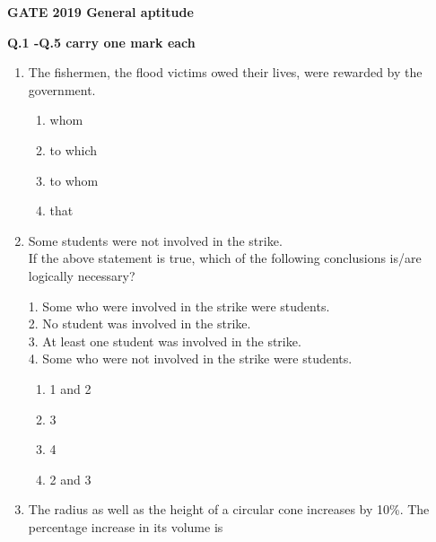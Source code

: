 \documentclass[journal,12pt,onecolumn]{IEEEtran}
\begin{document}
\begin{center}
\large\textbf{GATE 2019 General aptitude}
\end{center}

\vspace{2em}

\textbf{Q.1 -Q.5 carry one mark each}

\begin{enumerate}[itemsep=0.5cm]
    
\item The fishermen, \underline{\hspace{2cm}}  the flood victims owed their lives, were rewarded by the government.

\hfill{}
\begin{multicols}{4}
\begin{enumerate}
    \item whom
    \item to which
    \item to whom
    \item that
\end{enumerate}
\end{multicols}

\item Some students were not involved in the strike.\\
If the above statement is true, which of the following conclusions is/are logically necessary?

\vspace{1em}

    1. Some who were involved in the strike were students.\\
    2. No student was involved in the strike.\\
    3. At least one student was involved in the strike.\\
    4. Some who were not involved in the strike were students.

\hfill{}    

\begin{multicols}{4}
\begin{enumerate}
    \item 1 and 2
    \item 3
    \item 4
    \item 2 and 3
\end{enumerate}
\end{multicols}

\item The radius as well as the height of a circular cone increases by 10\%. The percentage increase in its volume is


\end{enumerate}
\end{document}
